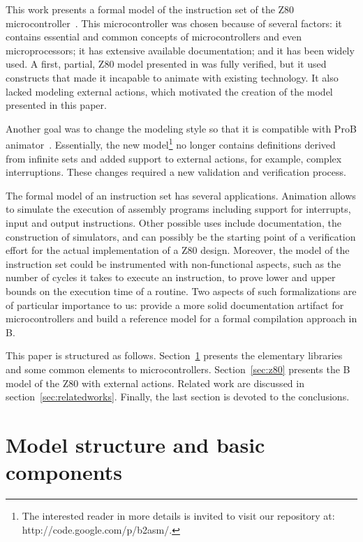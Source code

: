 \documentclass[a4paper]{llncs}
\begin{document}
This work presents a formal model of the instruction set of the Z80
microcontroller~\cite{Z80_manual}. This microcontroller was chosen
because of several factors: it contains essential and common concepts
of microcontrollers and even microprocessors; it has extensive
available documentation; and it has been widely used.  A first,
partial, Z80 model presented in \cite{Valerio_SBMF09} was fully
verified, but it used constructs that made it incapable to animate 
with existing technology. It also lacked modeling external actions,
which motivated the creation of the model presented in this paper. 

Another goal was to change the modeling style so that it is compatible 
with ProB animator~\cite{proB}.  Essentially, the new model\footnote{The
interested reader in more details is invited to visit our repository at: 
http://code.google.com/p/b2asm/.} no longer contains definitions derived
from infinite sets and added support to external actions, for example, complex
interruptions. These changes required a new validation and verification process.

The formal model of an instruction set has several
applications. Animation allows to simulate the execution of assembly
programs including support for interrupts, input and output
instructions. Other possible uses include documentation, the
construction of simulators, and can possibly be the starting point of
a verification effort for the actual implementation of a Z80
design. Moreover, the model of the instruction set could be
instrumented with non-functional aspects, such as the number of cycles
it takes to execute an instruction, to prove lower and upper bounds on
the execution time of a routine.  Two aspects of such formalizations
are of particular importance to us: provide a more solid documentation
artifact for microcontrollers and build a reference model for a formal
compilation approach in B.


This paper is structured as follows.  Section~\ref{sec:models}
presents the elementary libraries and some common elements
to microcontrollers.  Section~\ref{sec:z80} presents the B
model of the Z80 with external actions.  Related work are discussed in
section~\ref{sec:relatedworks}. Finally, the last section is devoted
to the conclusions.



\section{Model structure and basic components}
\label{sec:models}
\end{document}
